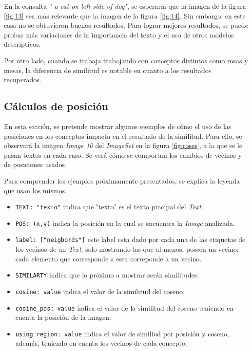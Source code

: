 En la consulta \textit{" a cat on left side of dog"}, se esperaría que la imagen de la figura \ref{fig:13} sea m\'as relevante que la imagen de la figura \ref{fig:14}. Sin embargo, en este caso no se obtuvieron buenos resultados. Para lograr mejores resultados, se puede probar m\'as variaciones de la importancia del texto y el uso de otros modelos descriptivos.

Por otro lado, cuando se trabaja trabajando con conceptos distintos como rosas y mesas, la diferencia de similitud es notable en cuanto a los resultados recuperados.

\subsection{C\'alculos de posici\'on}
En esta sección, se pretende mostrar algunos ejemplos de cómo el uso de las posiciones en los conceptos impacta en el resultado de la similitud. Para ello, se observar\'a la imagen \textit{Image 10} del \textit{ImageSet} en la figura \ref{fig:roses}, a la que se le pasan textos en cada caso. Se ver\'a cómo se comportan los cambios de vecinos y de posiciones usados.

Para comprender los ejemplos próximamente presentados, se explica la leyenda que usan los mismos.

\begin{itemize}
\item \verb|TEXT: "texto"| indica que "texto" es el texto pincipal del \textit{Text}.
\item \verb|POS: (x,y)| indica la posici\'on en la cual se encuentra la \textit{Image} analizada.
\item \verb|label: ["neigbords"]| este label esta dado por cada una de las etiquetas de los vecinos de un \textit{Text}, solo mostrando las que al menos, poseen un vecino; cada elemento que corresponde a esta correponde a un vecino.
\item \verb|SIMILARTY| indica que lo pr\'oximo a mostrar ser\'an similitudes.
\item \verb|cosine: value| indica el valor de la similitud del coseno.
\item \verb|cosine_pos: value| indica el valor de la similitud del coseno teniendo en cuenta la posici\'on de la imagen.
\item \verb|using region: value| indica el valor de similiud por posici\'on y coseno, adem\'as, teniendo en cuenta los vecinos de cada concepto.
\end{itemize}

